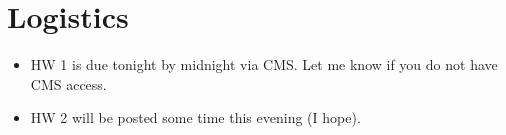\section{Logistics}

\begin{itemize}
\item HW 1 is due tonight by midnight via CMS.  Let me know if you
  do not have CMS access.
\item HW 2 will be posted some time this evening (I hope).
\end{itemize}
